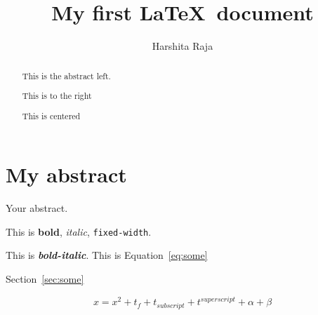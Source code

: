 \documentclass[twocolumn, 12pt]{article}
\begin{document}
\author{Harshita Raja}
\title{My first \LaTeX\ document}
\date{}

\maketitle

\begin{abstract}
	\begin{flushleft}
	\noindent This is the abstract left.
	\end{flushleft}
	
	\begin{flushright}
	This is to the right
	\end{flushright}
	
	\begin{center}
		This is centered
	\end{center}
	
\end{abstract}


\section*{My abstract}
Your abstract.

This is \textbf{bold}, \textit{italic}, \texttt{fixed-width}.

This is \textbf{\textit{bold-italic}}. This is Equation~\ref{eq:some}


Section~\ref{sec:some}

\begin{equation}
	x = x^2 + t_f + t_{subscript} + t^{superscript} + \alpha + \beta\label{eq:some}
\end{equation}





\begin{center}

\blindtext

\end{center}

\blindtext




%

\end{document}
